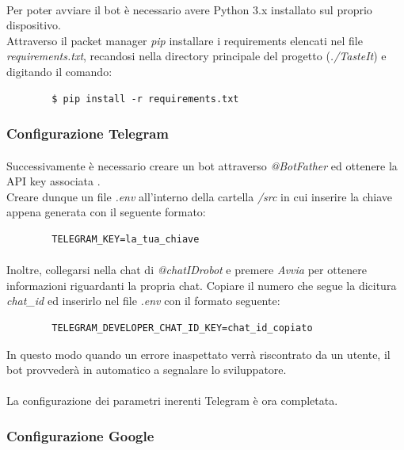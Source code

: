 \documentclass[a4paper, 12pt]{article}
\begin{document}
	\paragraph{}
	Per poter avviare il bot è necessario avere Python 3.x \cite{python_installation} installato sul proprio dispositivo.\\
	Attraverso il packet manager \textit{pip} installare i requirements elencati nel file \textit{requirements.txt}, recandosi nella directory principale del progetto (\textit{./TasteIt}) e digitando il comando:
	\begin{verbatim}
		$ pip install -r requirements.txt
	\end{verbatim}
\subsubsection{Configurazione Telegram}
	\paragraph{}
	Successivamente è necessario creare un bot attraverso \textit{@BotFather} ed ottenere la API key associata \cite{telegram_bot_creation}.\\
	Creare dunque un file \textit{.env} all'interno della cartella \textit{/src} in cui inserire la chiave appena generata con il seguente formato:
	\begin{verbatim}
		TELEGRAM_KEY=la_tua_chiave
	\end{verbatim}
	\paragraph{}
	Inoltre, collegarsi nella chat di \textit{@chatIDrobot} e premere \textit{Avvia} per ottenere informazioni riguardanti la propria chat. Copiare il numero che segue la dicitura \textit{chat\_id} ed inserirlo nel file \textit{.env} con il formato seguente:
	\begin{verbatim}
		TELEGRAM_DEVELOPER_CHAT_ID_KEY=chat_id_copiato
	\end{verbatim}
	In questo modo quando un errore inaspettato verrà riscontrato da un utente, il bot provvederà in automatico a segnalare lo sviluppatore.
	\paragraph{}
	La configurazione dei parametri inerenti Telegram è ora completata.
	
	\subsubsection{Configurazione Google}
\end{document}
